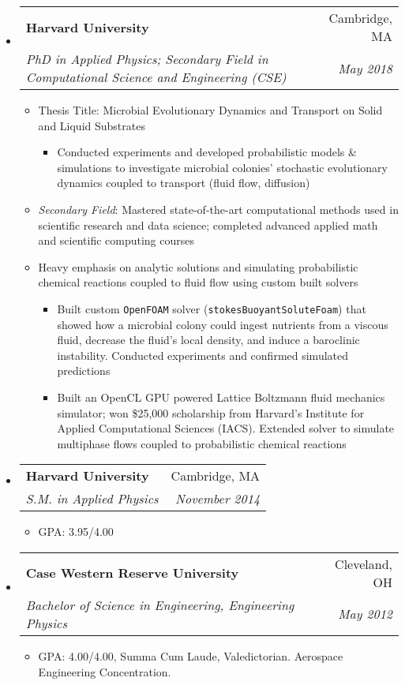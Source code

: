 \documentclass[letterpaper,11pt]{article}
\makeatletter
\newcommand{\resitem}[1]{\item #1 \vspace{-2pt}}
\newcommand{\ressubheading}[4]{\vspace{-14pt}
\begin{tabular*}{7.0in}{l@{\extracolsep{\fill}}r}
                \\
                \textbf{#1} & #2 \\
                \textit{#3} & \textit{#4} \\
\end{tabular*}\vspace{-6pt}}
\makeatother
\begin{document}
\begin{itemize}
\item \ressubheading{Harvard University}{Cambridge, MA}{PhD in Applied Physics; Secondary Field in Computational Science and Engineering (CSE)}{May 2018}     
\begin{itemize}
\resitem{Thesis Title: Microbial Evolutionary Dynamics and
Transport on Solid and Liquid Substrates}

\begin{itemize}
\resitem{Conducted experiments and developed probabilistic models \& simulations to investigate microbial colonies' stochastic evolutionary dynamics coupled to transport (fluid flow, diffusion)}
\end{itemize}

\resitem{\textit{Secondary Field}: Mastered state-of-the-art computational methods used in scientific research and data science; completed advanced applied math and scientific computing courses} 

\resitem{Heavy emphasis on analytic solutions and simulating probabilistic chemical reactions coupled to fluid flow using custom built solvers}

\begin{itemize}
\resitem{Built custom \texttt{OpenFOAM} solver (\texttt{stokesBuoyantSoluteFoam}) that showed how a microbial colony could ingest nutrients from a viscous fluid, decrease the fluid's local density, and induce a baroclinic instability. Conducted experiments and confirmed simulated predictions}
\resitem{Built an OpenCL GPU powered Lattice Boltzmann fluid mechanics simulator; won \$25,000 scholarship from Harvard's Institute for Applied Computational Sciences (IACS). Extended solver to simulate multiphase flows coupled to probabilistic chemical reactions}
\end{itemize}

\end{itemize} 
              
\item \ressubheading{Harvard University}{Cambridge, MA}{S.M. in Applied Physics}{November 2014}
        \begin{itemize}
        \resitem{GPA: 3.95/4.00}
        \end{itemize}
\item
        \ressubheading{Case Western Reserve University}{Cleveland, OH}{Bachelor of Science in Engineering, Engineering Physics}{May 2012}
        \begin{itemize}
                \resitem{GPA: 4.00/4.00, Summa Cum Laude, Valedictorian. Aerospace Engineering Concentration. }
        \end{itemize}
\end{itemize}
\end{document}
